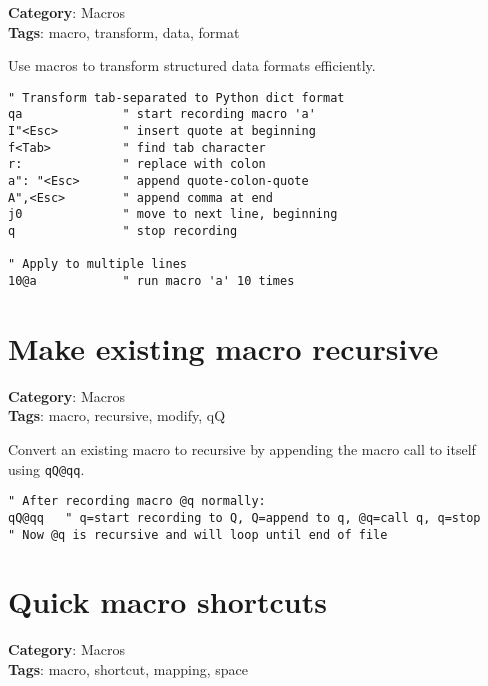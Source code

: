 {{{{{{{\textbf{Category}: Macros\\ \textbf{Tags}: macro, transform, data, format
\vspace{0.5cm}

Use macros to transform structured data formats efficiently.

\begin{Exa*}{}
\begin{Verbatim}[fontsize=\footnotesize, breaklines, breakanywhere]
" Transform tab-separated to Python dict format
qa              " start recording macro 'a'
I"<Esc>         " insert quote at beginning
f<Tab>          " find tab character
r:              " replace with colon
a": "<Esc>      " append quote-colon-quote
A",<Esc>        " append comma at end
j0              " move to next line, beginning
q               " stop recording

" Apply to multiple lines
10@a            " run macro 'a' 10 times
\end{Verbatim}
\end{Exa*}

\section{Make existing macro recursive}

\textbf{Category}: Macros\\ \textbf{Tags}: macro, recursive, modify, qQ
\vspace{0.5cm}

Convert an existing macro to recursive by appending the macro call to itself using {\footnotesize \Verb§qQ@qq§}.

\begin{Exa*}{}
\begin{Verbatim}[fontsize=\footnotesize, breaklines, breakanywhere]
" After recording macro @q normally:
qQ@qq   " q=start recording to Q, Q=append to q, @q=call q, q=stop
" Now @q is recursive and will loop until end of file
\end{Verbatim}
\end{Exa*}

\section{Quick macro shortcuts}

\textbf{Category}: Macros\\ \textbf{Tags}: macro, shortcut, mapping, space
\vspace{0.5cm}

}}}}}}}
